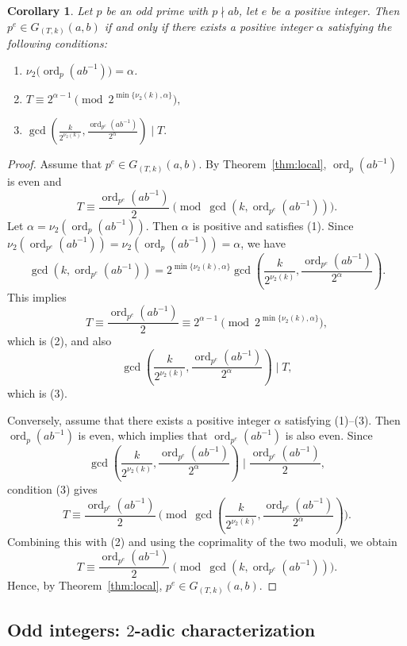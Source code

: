 \documentclass[pdflatex,sn-mathphys-num]{sn-jnl}%
\theoremstyle{thmstyleone}%
\newtheorem{corollary}[theorem]{Corollary}%
\theoremstyle{thmstyletwo}%
\theoremstyle{thmstylethree}%
\newcommand{\ord}{\operatorname{ord}}
\begin{document}
\begin{corollary}\label{cor:local-2adic}
Let $p$ be an odd prime with $p\nmid ab$, let $e$ be a positive integer. 
Then $
p^e\in G_{(T,k)}(a,b)$ 
if and only if there exists a positive integer $\alpha$ satisfying the  following conditions:
\begin{enumerate}[$(1)$]

\item 
$
\nu_2\bigl(\ord_p(ab^{-1})\bigr)=\alpha$.
\item
$
T\equiv 2^{\alpha-1}\pmod{2^{\min\{\nu_2(k),\alpha\}}},
$
\item $
\gcd\left(\frac{k}{2^{\nu_2(k)}},
\frac{\ord_{p^e}(ab^{-1})}{2^\alpha}\right)\mid T.
$
\end{enumerate}
\end{corollary}
\begin{proof}
Assume  that
$
p^e\in G_{(T,k)}(a,b)$.
By Theorem~\ref{thm:local}, $\ord_p(ab^{-1})$ is even and
\[
T\equiv \frac{\ord_{p^e}(ab^{-1})}{2}
\pmod{\gcd(k,\ord_{p^e}(ab^{-1}))}.
\]
Let $\alpha=\nu_2(\ord_p(ab^{-1}))  $. Then $\alpha$ is positive and satisfies (1). 
 Since
$
\nu_2(\ord_{p^e}(ab^{-1}))=\nu_2(\ord_p(ab^{-1}))=\alpha$, 
we have 
\[
\gcd(k,\ord_{p^e}(ab^{-1}))
=
2^{\min\{\nu_2(k),\alpha\}}
\gcd\left(\frac{k}{2^{\nu_2(k)}},
\frac{\ord_{p^e}(ab^{-1})}{2^\alpha}\right).
\]
This implies
\[
T\equiv \frac{\ord_{p^e}(ab^{-1})}{2}
\equiv 2^{\alpha-1}
\pmod{2^{\min\{\nu_2(k),\alpha\}}},
\]
which is (2), and also
\[
\gcd\left(\frac{k}{2^{\nu_2(k)}},
\frac{\ord_{p^e}(ab^{-1})}{2^\alpha}\right)\mid T,
\]
which is (3).

Conversely, assume that there exists a positive integer $\alpha$ satisfying  (1)--(3). Then $\ord_p(ab^{-1})$ is even, which implies that  $\ord_{p^e}(ab^{-1})$ is also even.  Since
\[
\gcd\left(\frac{k}{2^{\nu_2(k)}},
\frac{\ord_{p^e}(ab^{-1})}{2^\alpha}\right)
\mid
\frac{\ord_{p^e}(ab^{-1})}{2},
\]
condition \textup{(3)} gives
\[
T\equiv \frac{\ord_{p^e}(ab^{-1})}{2}
\pmod{
\gcd\left(\frac{k}{2^{\nu_2(k)}},
\frac{\ord_{p^e}(ab^{-1})}{2^\alpha}\right)}.
\]
Combining this with \textup{(2)} and using the coprimality of the two moduli, we obtain
\[
T\equiv \frac{\ord_{p^e}(ab^{-1})}{2}
\pmod{\gcd(k,\ord_{p^e}(ab^{-1}))}.
\]
Hence, by Theorem~\ref{thm:local}, $p^e\in G_{(T,k)}(a,b)$.
\end{proof}


 

\subsection{Odd integers:  $2$-adic characterization} \label{subsec:odd}
\end{document}
